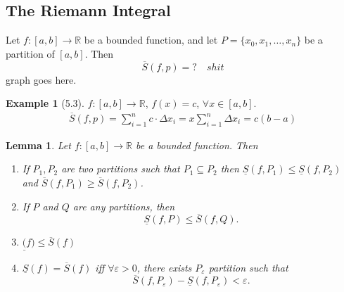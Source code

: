 \documentclass[12pt]{article}
\newtheorem{lemma}[theorem]{Lemma}
\theoremstyle{definition}
\theoremstyle{definition}
\newtheorem{exmp}{Example}[section]
\begin{document}
        \subsection{The Riemann Integral}
        Let $f:[a, b]\to\mathbb{R}$ be a bounded function, and let $P=\{x_0,
        x_1,\dots, x_n\}$ be a partition of $[a, b]$. Then 
            \begin{equation*}
                \overline{S}(f, p)=?\quad shit
            \end{equation*}
        graph goes here.
        \begin{exmp}[5.3]
            $f:[a, b]\to\mathbb{R}$, $f(x)=c$, $\forall x\in[a, b]$. 
                \begin{equation*}
                    \begin{split}
                        \overline{S}(f, p)=\sum_{i=1}^{n} c\cdot\Delta
                        x_i=x\sum_{i=1}^n \Delta x_i=c(b-a)
                    \end{split}
                \end{equation*} 
        \end{exmp}\newpage
        \begin{lemma}
            Let $f:[a, b]\to\mathbb{R}$ be a bounded function. Then 
            \begin{enumerate}
                \item If $P_1, P_2$ are two partitions such that $P_1\subseteq
                    P_2$ then $\underline{S}(f, P_1)\leq\underline{S}(f, P_2)$
                    and $\overline{S}(f, P_1)\geq\overline{S}(f, P_2)$.
                \item If $P$ and $Q$ are any partitions, then 
                    \begin{equation*}
                        \underline{S}(f, P)\leq\overline{S}(f, Q).
                    \end{equation*}
                \item $\underline(f)\leq\overline{S}(f)$
                \item $\underline{S}(f)=\overline{S}(f)$ iff $\forall
                    \varepsilon>0$, there exists $P_{\varepsilon}$ partition
                    such that 
                    \begin{equation*}
                        \overline{S}(f, P_{\varepsilon})-\underline{S}(f,
                        P_{\varepsilon})<\varepsilon.
                    \end{equation*}
            \end{enumerate}
        \end{lemma}
\end{document}
